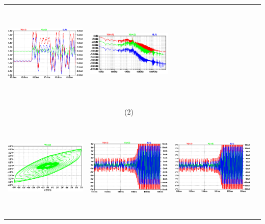 \documentclass{rbf}
\begin{document}
\begin{table}[h]
\begin{tabular}{c c c c}
            \includegraphics[width=5cm,height=5cm]{R7/1303 C 220 1ra EST 140ms time series.png}&
            \includegraphics[width=5cm,height=5cm]{R7/1303 C 220 1ra EST 140ms fft.png}&\\
            & (2) &  \\
            \includegraphics[width=5cm,height=5cm]{R7/1303 C 220 2do EST 200ms atractor.png}&
            \includegraphics[width=5cm,height=5cm]{R7/1303 C 220 2do EST 200ms time series.png}&
            \includegraphics[width=5cm,height=5cm]{R7/1303 C 220 2do EST 200ms time series.png}&\\

\end{tabular}
\end{table}
\end{document}
